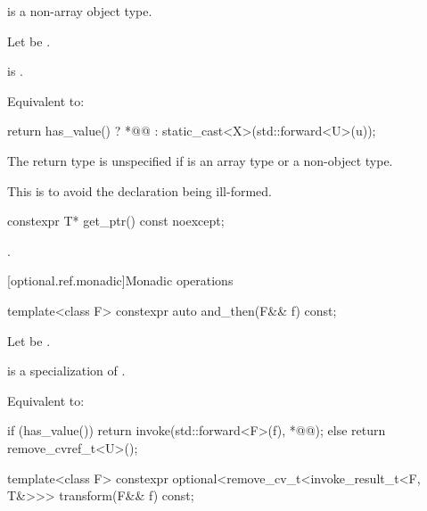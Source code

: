 \begin{itemdescr}
\pnum
\constraints
{} is a non-array object type.

\pnum
 Let  be .

\pnum
\mandates
{} is .

\pnum
\effects
 Equivalent to:
\begin{codeblock}
return has_value() ? *@@ : static_cast<X>(std::forward<U>(u));
\end{codeblock}

\pnum
\remarks
The return type is unspecified if
 is an array type or a non-object type.
\begin{note}
This is to avoid the declaration being ill-formed.
\end{note}
\end{itemdescr}

\begin{itemdecl}
constexpr T* get_ptr() const noexcept;
\end{itemdecl}

\begin{itemdescr}
\pnum
\returns
{}.
\end{itemdescr}

[optional.ref.monadic]{Monadic operations}

\begin{itemdecl}
template<class F> constexpr auto and_then(F&& f) const;
\end{itemdecl}

\begin{itemdescr}
\pnum
Let  be .

\pnum
\mandates
{} is a specialization of .

\pnum
\effects
  Equivalent to:
\begin{codeblock}
if (has_value()) {
  return invoke(std::forward<F>(f), *@@);
} else {
  return remove_cvref_t<U>();
}
\end{codeblock}
\end{itemdescr}

\begin{itemdecl}
template<class F>
  constexpr optional<remove_cv_t<invoke_result_t<F, T&>>> transform(F&& f) const;
\end{itemdecl}

